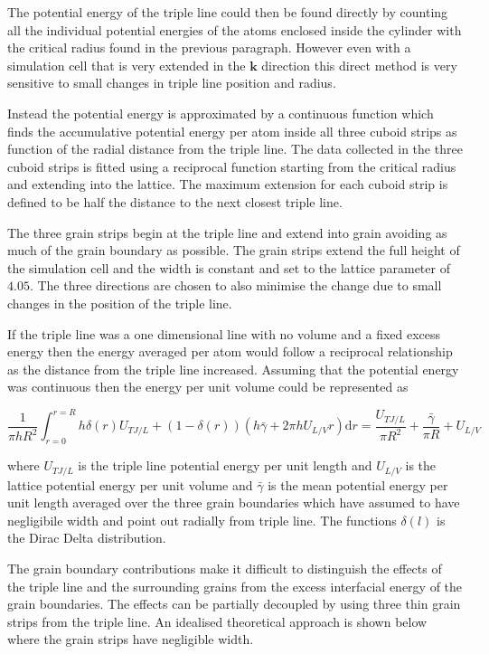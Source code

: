 \documentclass[12pt,a4paper]{book}
\begin{document}
The potential energy of the triple line could then be found directly by counting all the individual potential energies of the atoms enclosed inside the cylinder with the critical radius found in the previous paragraph. However even with a simulation cell that is very extended in the $\mathbf{k}$ direction this direct method is very sensitive to small changes in triple line position and radius.

Instead the potential energy is approximated by a continuous function which finds the accumulative potential energy per atom inside all three cuboid strips as function of the radial distance from the triple line. The data collected in the three cuboid strips is fitted using a reciprocal function starting from the critical radius and extending into the lattice. The maximum extension for each cuboid strip is defined to be half the distance to the next closest triple line.

The three grain strips begin at the triple line and extend into grain avoiding as much of the grain boundary as possible. The grain strips extend the full height of the simulation cell and the width is constant and set to the lattice parameter of $4.05$. The three directions are chosen to also minimise the change due to small changes in the position of the triple line. 

If the triple line was a one dimensional line with no volume and a fixed excess energy then the energy averaged per atom would follow a reciprocal relationship as the distance from the triple line increased. Assuming that the potential energy was continuous then the energy per unit volume could be represented as 

\[ \frac{1}{\pi h R^2}\int_{r=0}^{r=R} h \delta(r) U_{TJ/L} + (1-\delta(r) )\left( h \bar{\gamma} + 2 \pi h U_{L/V} r \right) \text{d}r = \frac{U_{TJ/L}}{\pi R^2} + \frac{\bar{\gamma}}{\pi R} + U_{L/V} \]

where $U_{TJ/L}$ is the triple line potential energy per unit length and $U_{L/V}$ is the lattice potential energy per unit volume and $\bar{\gamma}$ is the mean potential energy per unit length averaged over the three grain boundaries which have assumed to have negligibile width and point out radially from triple line. The functions $\delta(l)$ is the Dirac Delta distribution.

The grain boundary contributions make it difficult to distinguish the effects of the triple line and the surrounding grains from the excess interfacial energy of the grain boundaries. The effects can be partially decoupled by using three thin grain strips from the triple line. An idealised theoretical approach is shown below where the grain strips have negligible width.
\end{document}
